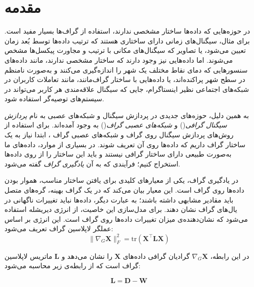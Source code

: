 \documentclass[10pt,twocolumn,a4paper]{article}
\begin{document}
	
	
	\section{مقدمه}
	در حوزه‌هایی که داده‌ها ساختار مشخصی ندارند، استفاده از گراف‌ها بسیار مفید است. برای مثال، سیگنال‌های زمانی دارای ساختاری هستند که ترتیب داده‌ها توسط بُعد زمان تعیین می‌شود، یا تصاویر که سیگنال‌های مکانی با ترتیب و مجاورت پیکسل‌ها مشخص می‌شوند. اما داده‌هایی نیز وجود دارند که ساختار مشخصی ندارند، مانند داده‌های سنسورهایی که دمای نقاط مختلف یک شهر را اندازه‌گیری می‌کنند و به‌صورت نامنظم در سطح شهر پراکنده‌اند، یا داده‌هایی با ساختار گراف‌مانند، مانند تعاملات کاربران در شبکه‌های اجتماعی نظیر اینستاگرام، جایی که سیگنال علاقه‌مندی هر کاربر می‌تواند در سیستم‌های توصیه‌گر استفاده شود.
	
	به همین دلیل، حوزه‌های جدیدی در پردازش سیگنال و شبکه‌های عصبی به نام 
	\textit{پردازش سیگنال گرافی}()\cite{GSP}
	و
	\textit{شبکه‌های عصبی گراف}()\cite{GNN}
	به وجود آمده‌اند.
	برای استفاده از روش‌های پردازش سیگنال روی گراف و شبکه‌های عصبی گراف ، ابتدا نیاز به یک ساختار گراف داریم که داده‌ها روی آن تعریف شوند. در بسیاری از موارد، داده‌های ما به‌صورت طبیعی دارای ساختار گرافی نیستند و باید این ساختار را از روی داده‌ها استخراج کنیم؛ فرآیندی که به آن 
	\textit{یادگیری گراف}
	گفته می‌شود.
	
	
	
	
	
	
	در یادگیری گراف، یکی از معیارهای کلیدی برای یافتن ساختار مناسب، هموار بودن داده‌ها روی گراف است. این معیار بیان می‌کند که در یک گراف بهینه، گره‌های متصل باید مقادیر مشابهی داشته باشند؛ به عبارت دیگر، داده‌ها نباید تغییرات ناگهانی در یال‌های گراف نشان دهند. برای مدل‌سازی این خاصیت، از انرژی دیریشله استفاده می‌شود که نشان‌دهنده‌ی میزان تغییرات داده‌ها روی گراف است. این انرژی بر اساس عملگر لاپلاسین گراف تعریف می‌شود:
	\begin{equation}
		\|\nabla_G \bm{X}\|_F^2 = \text{tr} (\bm{X}^\top \bm{L} \bm{X})
	\end{equation}
	
	در این رابطه، \( \nabla_G \bm{X} \) گرادیان گرافی داده‌های \( \bm{X} \) را نشان می‌دهد و \( \bm{L} \) ماتریس لاپلاسین گراف است که از رابطه‌ی زیر محاسبه می‌شود:
	
	\begin{equation}\label{eq:defL}
		\bm{L} = \bm{D} - \bm{W}
	\end{equation}
	
\end{document}
